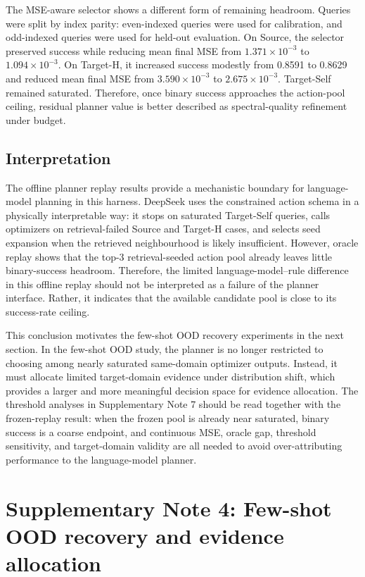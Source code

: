 \documentclass[final,1p,times]{elsarticle}
\begin{document}
The MSE-aware selector shows a different form of remaining headroom. Queries were split by index parity: even-indexed queries were used for calibration, and odd-indexed queries were used for held-out evaluation. On Source, the selector preserved success while reducing mean final MSE from $1.371\times10^{-3}$ to $1.094\times10^{-3}$. On Target-H, it increased success modestly from 0.8591 to 0.8629 and reduced mean final MSE from $3.590\times10^{-3}$ to $2.675\times10^{-3}$. Target-Self remained saturated. Therefore, once binary success approaches the action-pool ceiling, residual planner value is better described as spectral-quality refinement under budget.

\subsection{Interpretation}

The offline planner replay results provide a mechanistic boundary for language-model planning in this harness. DeepSeek uses the constrained action schema in a physically interpretable way: it stops on saturated Target-Self queries, calls optimizers on retrieval-failed Source and Target-H cases, and selects seed expansion when the retrieved neighbourhood is likely insufficient. However, oracle replay shows that the top-3 retrieval-seeded action pool already leaves little binary-success headroom. Therefore, the limited language-model--rule difference in this offline replay should not be interpreted as a failure of the planner interface. Rather, it indicates that the available candidate pool is close to its success-rate ceiling.

This conclusion motivates the few-shot OOD recovery experiments in the next section. In the few-shot OOD study, the planner is no longer restricted to choosing among nearly saturated same-domain optimizer outputs. Instead, it must allocate limited target-domain evidence under distribution shift, which provides a larger and more meaningful decision space for evidence allocation. The threshold analyses in Supplementary Note 7 should be read together with the frozen-replay result: when the frozen pool is already near saturated, binary success is a coarse endpoint, and continuous MSE, oracle gap, threshold sensitivity, and target-domain validity are all needed to avoid over-attributing performance to the language-model planner.



\section{Supplementary Note 4: Few-shot OOD recovery and evidence allocation}
\end{document}
